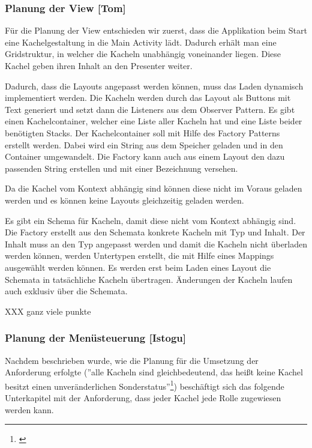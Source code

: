 
\clearpage

\subsubsection{Planung der View [Tom]}

Für die Planung der View entschieden wir zuerst, dass die Applikation beim Start eine Kachelgestaltung in die Main Activity lädt. Dadurch erhält man eine Gridstruktur, in welcher die Kacheln unabhängig voneinander liegen. Diese Kachel geben ihren Inhalt an den Presenter weiter.

Dadurch, dass die Layouts angepasst werden können, muss das Laden dynamisch implementiert werden. Die Kacheln werden durch das Layout als Buttons mit Text generiert und setzt dann die Listeners aus dem Observer Pattern. Es gibt einen Kachelcontainer, welcher eine Liste aller Kacheln hat und eine Liste beider benötigten Stacks. Der Kachelcontainer soll mit Hilfe des Factory Patterns erstellt werden. Dabei wird ein String aus dem Speicher geladen und in den Container umgewandelt. Die Factory kann auch aus einem Layout den dazu passenden String erstellen und mit einer Bezeichnung versehen. 

Da die Kachel vom Kontext abhängig sind können diese nicht im Voraus geladen werden und es können keine Layouts gleichzeitig geladen werden. 

Es gibt ein Schema für Kacheln, damit diese nicht vom Kontext abhängig sind. Die Factory erstellt aus den Schemata konkrete Kacheln mit Typ und Inhalt. Der Inhalt muss an den Typ angepasst werden und damit die Kacheln nicht überladen werden können, werden Untertypen erstellt, die mit Hilfe eines Mappings ausgewählt werden können. Es werden erst beim Laden eines Layout die Schemata in tatsächliche Kacheln übertragen. Änderungen der Kacheln laufen auch exklusiv über die Schemata.

XXX ganz viele punkte

\clearpage

\subsubsection{Planung der Menüsteuerung [Istogu]}

Nachdem beschrieben wurde, wie die Planung für die Umsetzung der Anforderung erfolgte (''alle Kacheln sind gleichbedeutend, das heißt keine Kachel besitzt einen unveränderlichen Sonderstatus''\footnote{\cite[vgl.][]{seifert2020a}}) beschäftigt sich das folgende Unterkapitel mit der Anforderung, dass jeder Kachel jede Rolle zugewiesen werden kann.

